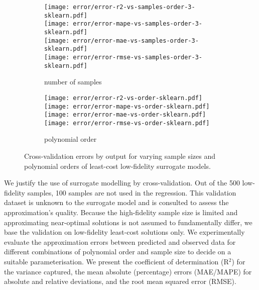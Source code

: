
\begin{figure}
        \begin{subfigure}[t]{.48\textwidth}
            \centering
            \caption{number of samples}
            \label{fig:error:samples}
            \texttt{[image: error/error-r2-vs-samples-order-3-sklearn.pdf]}
            \\
            \texttt{[image: error/error-mape-vs-samples-order-3-sklearn.pdf]}
            \\
            \texttt{[image: error/error-mae-vs-samples-order-3-sklearn.pdf]}
            \\
            \texttt{[image: error/error-rmse-vs-samples-order-3-sklearn.pdf]}
        \end{subfigure}
        \begin{subfigure}[t]{.48\textwidth}
            \centering
            \caption{polynomial order}
            \label{fig:error:poly}
            \texttt{[image: error/error-r2-vs-order-sklearn.pdf]}
            \\
            \texttt{[image: error/error-mape-vs-order-sklearn.pdf]}
            \\
            \texttt{[image: error/error-mae-vs-order-sklearn.pdf]}
            \\
            \texttt{[image: error/error-rmse-vs-order-sklearn.pdf]}
        \end{subfigure}
    \caption[Cross-validation errors]{Cross-validation errors by output for
    varying sample sizes and polynomial orders of least-cost low-fidelity
    surrogate models.}
    \label{fig:error}
\end{figure}

We justify the use of surrogate modelling by cross-validation. Out of the 500
low-fidelity samples, 100 samples are not used in the regression. This
validation dataset is unknown to the surrogate model and is consulted to assess
the approximation's quality. Because the high-fidelity sample size is limited
and approximating near-optimal solutions is not assumed to fundamentally differ,
we base the validation on low-fidelity least-cost solutions only. We
experimentally evaluate the approximation errors between predicted and observed
data for different combinations of polynomial order and sample size to decide on
a suitable parameterisation. We present the coefficient of determination (R$^2$)
for the variance captured, the mean absolute (percentage) errors (MAE/MAPE) for
absolute and relative deviations, and the root mean squared error (RMSE).

